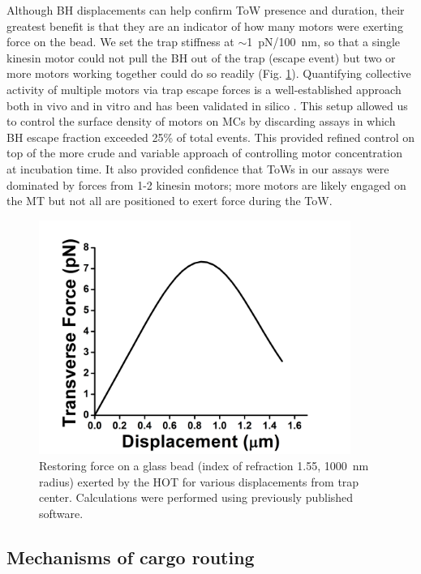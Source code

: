Although BH displacements can help confirm ToW presence and duration, their greatest benefit is that they are an indicator of how many motors were exerting force on the bead. We set the trap stiffness at $\sim$\SI{1}{\pico\newton}/\SI{100}{\nano\meter}, so that a single kinesin motor could not pull the BH out of the trap (escape event) but two or more motors working together could do so readily (Fig. \ref{fig:BHforce}). Quantifying collective activity of multiple motors via trap escape forces is a well-established approach both in vivo \cite{Ashkin1990,Gross2002} and in vitro \cite{McKenney2010} and has been validated in silico \cite{McKenney2010}. This setup allowed us to control the surface density of motors on MCs by discarding assays in which BH escape fraction exceeded 25\% of total events. This provided refined control on top of the more crude and variable approach of controlling motor concentration at incubation time. It also provided confidence that ToWs in our assays were dominated by forces from 1-2 kinesin motors; more motors are likely engaged on the MT but not all are positioned to exert force during the ToW.

\begin{figure}
\centering
\includegraphics[width=4in]{appendix2/FvsL}
\caption[Restoring force on Bead Handles]{Restoring force on a glass bead (index of refraction 1.55, \SI{1000}{\nano\meter} radius) exerted by the HOT for various displacements from trap center. Calculations were performed using previously published software\cite{Nahmias2002}.}
\label{fig:BHforce}
\end{figure}

\subsection{Mechanisms of cargo routing}

